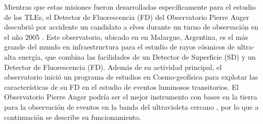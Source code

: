\documentclass[12pt,oneside,openany,letter]{book}
\begin{document}
Mientras que estas misiones fueron desarrolladas específicamente para el estudio de los TLEs, el Detector de Fluorescencia (FD) del Observatorio Pierre Auger descubrió por accidente un candidato a elves durante un turno de observación en el año 2005 \cite{Mussa2019}. Este observatorio, ubicado en en Malargue, Argentina, es el más grande del mundo en infraestructura para el estudio de rayos cósmicos de ultra-alta energía, que combina las facilidades de un Detector de Superficie (SD) y un Detector de Fluorescencia (FD). Además de su actividad principal, el observatorio inició un programa de estudios en Cosmo-geofísica para explotar las características de su FD en el estudio de eventos luminosos transitorios. El Observatorio Pierre Auger podría ser el mejor instrumento con bases en la tierra para la observación de eventos en la banda del ultravioleta cercano \cite{MussaCiaccio2012}, por lo que a continuación se describe su funcionamiento.  

\end{document}
